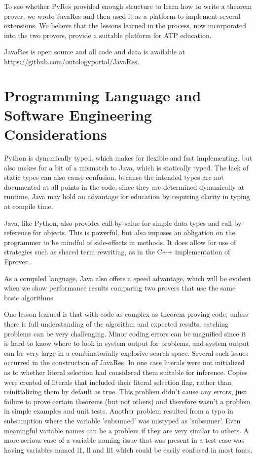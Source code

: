 \documentclass{llncs}
\begin{document}
To see whether PyRes provided
enough structure to learn how to write a theorem prover, we wrote
JavaRes and then used it as a platform to
implement several extensions.  We believe that the lessons learned
in the process, now incorporated into the two provers,
provide a suitable platform for ATP education.

JavaRes is open source and all code and data is available at
\url{https://github.com/ontologyportal/JavaRes}.




\section{Programming Language and Software Engineering Considerations}

Python is dynamically typed, which makes for flexible and fast
implementing, but also makes for a bit of a mismatch to Java, which is
statically typed.  The lack of static types can also cause confusion,
because the intended types are not documented at all points in the
code, since they are determined dynamically at runtime.  Java may hold
an advantage for education by requiring clarity in typing at compile
time.

Java, like Python, also provides call-by-value for simple data types
and call-by-reference for objects.  This is powerful, but also imposes
an obligation on the programmer to be mindful of side-effects in
methods.  It does allow for use of strategies such as shared term
rewriting, as in the C++ implementation of Eprover \cite{LS:LPAR-WS-2001}.

As a compiled language, Java also offers a speed advantage, which will
be evident when we show performance results comparing two provers that
use the same basic algorithms.

One lesson learned is that with code as complex as theorem proving
code, unless there is full understanding of the algorithm and expected
results, catching problems can be very challenging.  Minor coding
errors can be magnified since it is hard to know where to look in
system output for problems, and system output can be very large in a
combinatorially explosive search space.  Several such issues occurred
in the construction of JavaRes.  In one case literals were not
initialized as to whether literal selection had considered them
suitable for inference.  Copies were created of literals that included
their literal selection flag, rather than reinitializing them by
default as true.  This problem didn't cause any errors, just failure
to prove certain theorems (but not others) and therefore wasn't a
problem in simple examples and unit tests.  Another problem resulted
from a typo in subsumption where the variable 'subsumed' was mistyped
as 'subsumer'.  Even meaningful variable names can be a problem if
they are very similar to others.  A more serious case of a variable
naming issue that was present in a test case was having variables
named l1, ll and ll1 which could be easily confused in most fonts.
\end{document}
